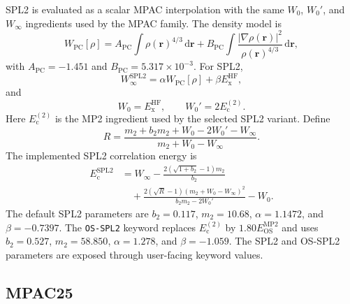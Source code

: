 \documentclass[aip,jcp,reprint,superscriptaddress]{revtex4-2}
\newcommand{\keyword}[1]{\texttt{#1}}
\newcommand{\dd}{\mathrm{d}}
\newcommand{\ExHF}{E_{\mathrm{x}}^{\mathrm{HF}}}
\begin{document}
SPL2 is evaluated as a scalar MPAC interpolation with the same \(W_0\), \(W_0'\), and \(W_\infty\) ingredients used by the MPAC family.\cite{MPACF1}  The density model is
\begin{equation}
  W_{\mathrm{PC}}[\rho]
  =
  A_{\mathrm{PC}}\int \rho(\mathbf{r})^{4/3}\,\dd\mathbf{r}
  +
  B_{\mathrm{PC}}\int
  \frac{|\nabla\rho(\mathbf{r})|^2}{\rho(\mathbf{r})^{4/3}}
  \,\dd\mathbf{r},
  \label{eq:pc_model}
\end{equation}
with \(A_{\mathrm{PC}}=-1.451\) and \(B_{\mathrm{PC}}=5.317\times10^{-3}\).  For SPL2,
\begin{equation}
  W_\infty^{\mathrm{SPL2}}
  =
  \alpha W_{\mathrm{PC}}[\rho]+\beta\ExHF,
\end{equation}
and
\begin{equation}
  W_0=\ExHF,\qquad W_0'=2E_{\mathrm{c}}^{(2)}.
\end{equation}
Here \(E_{\mathrm{c}}^{(2)}\) is the MP2 ingredient used by the selected SPL2 variant.  Define
\begin{equation}
  R=
  \frac{
    m_2+b_2m_2+W_0-2W_0'-W_\infty
  }
  {m_2+W_0-W_\infty}.
\end{equation}
The implemented SPL2 correlation energy is
\begin{equation}
  \begin{aligned}
  E_{\mathrm{c}}^{\mathrm{SPL2}}
  &=
  W_\infty
  -
  \frac{2(\sqrt{1+b_2}-1)m_2}{b_2}
  \\
  &\quad+
  \frac{
    2(\sqrt{R}-1)(m_2+W_0-W_\infty)^2
  }
  {b_2m_2-2W_0'}
  -W_0 .
  \end{aligned}
  \label{eq:spl2_energy}
\end{equation}
The default SPL2 parameters are \(b_2=0.117\), \(m_2=10.68\), \(\alpha=1.1472\), and \(\beta=-0.7397\).  The \keyword{OS-SPL2} keyword replaces \(E_{\mathrm{c}}^{(2)}\) by \(1.80E_{\mathrm{OS}}^{\mathrm{MP2}}\) and uses \(b_2=0.527\), \(m_2=58.850\), \(\alpha=1.278\), and \(\beta=-1.059\).  The SPL2 and OS-SPL2 parameters are exposed through user-facing keyword values.

\subsection{MPAC25}
\end{document}
